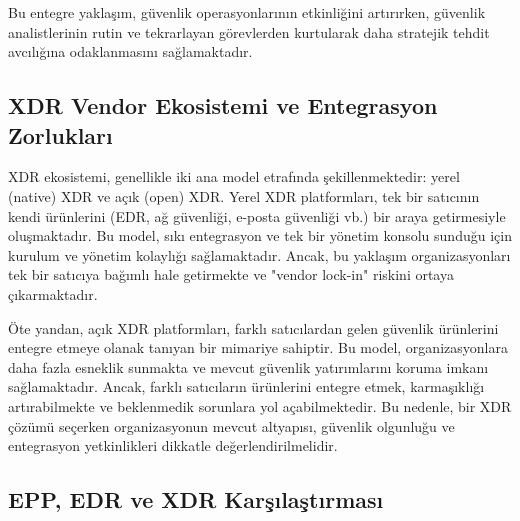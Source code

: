 Bu entegre yaklaşım, güvenlik operasyonlarının etkinliğini artırırken, güvenlik analistlerinin rutin ve tekrarlayan görevlerden kurtularak daha stratejik tehdit avcılığına odaklanmasını sağlamaktadır.

\subsection{XDR Vendor Ekosistemi ve Entegrasyon Zorlukları}

XDR ekosistemi, genellikle iki ana model etrafında şekillenmektedir: yerel (native) XDR ve açık (open) XDR. Yerel XDR platformları, tek bir satıcının kendi ürünlerini (EDR, ağ güvenliği, e-posta güvenliği vb.) bir araya getirmesiyle oluşmaktadır. Bu model, sıkı entegrasyon ve tek bir yönetim konsolu sunduğu için kurulum ve yönetim kolaylığı sağlamaktadır. Ancak, bu yaklaşım organizasyonları tek bir satıcıya bağımlı hale getirmekte ve "vendor lock-in" riskini ortaya çıkarmaktadır.

Öte yandan, açık XDR platformları, farklı satıcılardan gelen güvenlik ürünlerini entegre etmeye olanak tanıyan bir mimariye sahiptir. Bu model, organizasyonlara daha fazla esneklik sunmakta ve mevcut güvenlik yatırımlarını koruma imkanı sağlamaktadır. Ancak, farklı satıcıların ürünlerini entegre etmek, karmaşıklığı artırabilmekte ve beklenmedik sorunlara yol açabilmektedir. Bu nedenle, bir XDR çözümü seçerken organizasyonun mevcut altyapısı, güvenlik olgunluğu ve entegrasyon yetkinlikleri dikkatle değerlendirilmelidir.

\subsection{EPP, EDR ve XDR Karşılaştırması}

